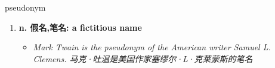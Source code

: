 
\begin{frame}
{\huge pseudonym}
\begin{center}
\begin{enumerate}\Large
  \item \textbf{n. 假名,笔名: a fictitious name}
  \begin{itemize}
    \item \em{\Large{Mark Twain is the pseudonym of the American writer Samuel L. Clemens. 马克·吐温是美国作家塞缪尔·L·克莱蒙斯的笔名}}
  \end{itemize}
\end{enumerate}
\end{center}
\end{frame}
